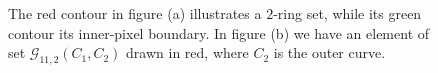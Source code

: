 \documentclass[runningheads]{llncs}
\begin{document}
\begin{figure}
\center
	\hspace{40pt}%
	\caption{The red contour in figure (a) illustrates a $2$-ring set, while its green contour its inner-pixel boundary. In figure (b) we have an element of set $\mathcal{G}_{11,2}(C_1,C_2)$ drawn in red, where $C_2$ is the outer curve. }
\end{figure}
\end{document}
